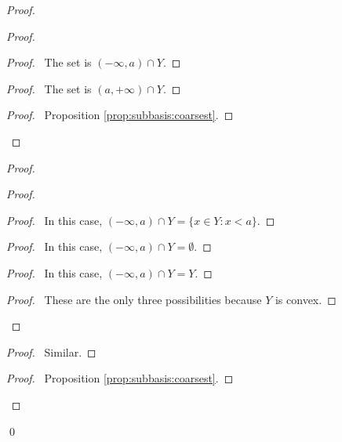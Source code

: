 \begin{proof}
  \pf
  \begin{proof}
    \begin{proof}
      \pf\ The set is $(- \infty, a) \cap Y$.
    \end{proof}
    \begin{proof}
      \pf\ The set is $(a, + \infty) \cap Y$.
    \end{proof}
    \qedstep
    \begin{proof}
      \pf\ Proposition \ref{prop:subbasis:coarsest}.
    \end{proof}
  \end{proof}
  \begin{proof}
    \begin{proof}
      \begin{proof}
        \pf\ In this case, $(- \infty, a) \cap Y = \{ x \in Y : x < a \}$.
      \end{proof}
      \begin{proof}
        \pf\ In this case, $(- \infty, a) \cap Y = \emptyset$.
      \end{proof}
      \begin{proof}
        \pf\ In this case, $(- \infty, a) \cap Y = Y$.
      \end{proof}
      \qedstep
      \begin{proof}
        \pf\ These are the only three possibilities because $Y$ is convex.
      \end{proof}
    \end{proof}
    \begin{proof}
      \pf\ Similar.
    \end{proof}
    \qedstep
    \begin{proof}
      \pf\ Proposition \ref{prop:subbasis:coarsest}.
    \end{proof}
  \end{proof}
  \qed
\end{proof}

